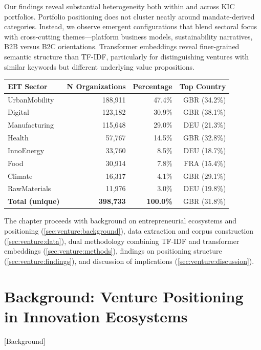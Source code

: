 \documentclass[../main.tex]{subfiles}
\begin{document}
Our findings reveal substantial heterogeneity both within and across KIC portfolios. Portfolio positioning does not cluster neatly around mandate-derived categories. Instead, we observe emergent configurations that blend sectoral focus with cross-cutting themes---platform business models, sustainability narratives, B2B versus B2C orientations. Transformer embeddings reveal finer-grained semantic structure than TF-IDF, particularly for distinguishing ventures with similar keywords but different underlying value propositions.

\begin{center}
\scriptsize
\setlength{\tabcolsep}{4pt}
\begin{tabular}{lrrr}
\toprule
\textbf{EIT Sector} & \textbf{N Organizations} & \textbf{Percentage} & \textbf{Top Country} \\
\midrule
UrbanMobility & 188,911 & 47.4\% & GBR (34.2\%) \\
Digital & 123,182 & 30.9\% & GBR (38.1\%) \\
Manufacturing & 115,648 & 29.0\% & DEU (21.3\%) \\
Health & 57,767 & 14.5\% & GBR (32.8\%) \\
InnoEnergy & 33,760 & 8.5\% & DEU (18.7\%) \\
Food & 30,914 & 7.8\% & FRA (15.4\%) \\
Climate & 16,317 & 4.1\% & GBR (29.1\%) \\
RawMaterials & 11,976 & 3.0\% & DEU (19.8\%) \\
\midrule
\textbf{Total (unique)} & \textbf{398,733} & \textbf{100.0\%} & GBR (31.8\%) \\
\bottomrule
\end{tabular}
\end{center}

The chapter proceeds with background on entrepreneurial ecosystems and positioning (\cref{sec:venture:background}), data extraction and corpus construction (\cref{sec:venture:data}), dual methodology combining TF-IDF and transformer embeddings (\cref{sec:venture:methods}), findings on positioning structure (\cref{sec:venture:findings}), and discussion of implications (\cref{sec:venture:discussion}).

\section{Background: Venture Positioning in Innovation Ecosystems}[Background]
\end{document}
